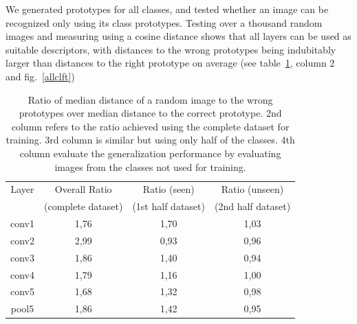 We generated prototypes for all classes, and tested whether an image can be recognized only using its class prototypes. Testing over a thousand random images and measuring using a cosine distance shows that all layers can be used as suitable descriptors, with distances to the wrong prototypes being indubitably larger than distances to the right prototype on average (see table~\ref{fulltrainvalues}, column 2 and fig.~\ref{allclft})

\begin{table}[htb]
\centering
\begin{tabular}{|c|c||c|c|}
  \hline
  Layer & Overall Ratio & Ratio (seen)  & Ratio (unseen)\\
        & (complete dataset) & (1st half dataset) & (2nd half dataset) \\
  \hline
  conv1 & 1,76 & 1,70 & 1,03 \\ 
  conv2 & 2,99 & 0,93 & 0,96 \\ 
  conv3 & 1,86 & 1,40 & 0,94 \\ 
  conv4 & 1,79 & 1,16 & 1,00 \\ 
  conv5 & 1,68 & 1,32 & 0,98 \\ 
  pool5 & 1,86 & 1,42 & 0,95 \\ 
  \hline
\end{tabular}
\caption{Ratio of median distance of a random image to the wrong prototypes over median distance to the correct prototype. 2nd column refers to the ratio achieved using the complete dataset for training. 3rd column is similar but using only half of the classes. 4th column evaluate the generalization performance by evaluating images from the classes not used for training.}
\label{fulltrainvalues}
\end{table}

